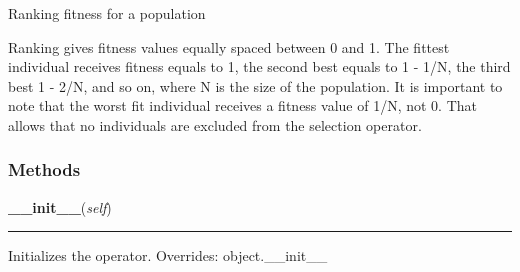 Ranking fitness for a population

Ranking gives fitness values equally spaced between 0 and 1. The fittest
individual receives fitness equals to 1, the second best equals to 1 - 1/N,
the third best 1 - 2/N, and so on, where N is the size of the population.
It is important to note that the worst fit individual receives a fitness
value of 1/N, not 0. That allows that no individuals are excluded from the
selection operator.


  \subsubsection{Methods}

    \vspace{0.5ex}

\hspace{.8\funcindent}\begin{boxedminipage}{\funcwidth}

    \raggedright \textbf{\_\_init\_\_}(\textit{self})

    \vspace{-1.5ex}

    \rule{\textwidth}{0.5\fboxrule}
\setlength{\parskip}{2ex}

Initializes the operator.
\setlength{\parskip}{1ex}
      Overrides: object.\_\_init\_\_

    \end{boxedminipage}

    \vspace{0.5ex}

